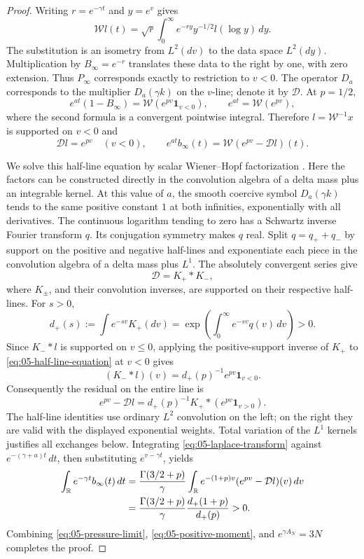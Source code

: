 \begin{proof}
Writing \(r=e^{-\gamma t}\) and \(y=e^v\) gives
\[
 \mathcal Wl(t)=\sqrt r\int_0^\infty e^{-ry}
                   y^{-1/2}l(\log y)\,dy.
\]
The substitution is an isometry from \(L^2(dv)\) to the data space \(L^2(dy)\). Multiplication by \(B_\infty=e^{-r}\) translates these data to the right by one, with zero extension. Thus \(P_\infty\) corresponds exactly to restriction to \(v<0\). The operator \(D_a\) corresponds to the multiplier \(D_a(\gamma k)\) on the \(v\)-line; denote it by \(\mathcal D\). At \(p=1/2\),
\[
 e^{at}(1-B_\infty)=\mathcal W(e^{pv}\mathbf1_{v<0}),
 \qquad e^{at}=\mathcal W(e^{pv}),
\]
where the second formula is a convergent pointwise integral. Therefore \(l=\mathcal W^{-1}x\) is supported on \(v<0\) and
\begin{equation}
 \mathcal Dl=e^{pv}\quad(v<0),\qquad
 e^{at}b_\infty(t)=\mathcal W(e^{pv}-\mathcal Dl)(t).
 \label{eq:05-half-line-equation}
\end{equation}

We solve this half-line equation by scalar Wiener--Hopf factorization
\cite{WienerHopf1931}. Here the factors can be constructed directly in
the convolution algebra of a delta mass plus an integrable kernel.
At this value of \(a\), the smooth coercive symbol \(D_a(\gamma k)\)
tends to the same positive constant \(1\) at both infinities,
exponentially with all derivatives. The continuous logarithm tending to zero has a Schwartz inverse Fourier transform \(q\). Its conjugation symmetry makes \(q\) real. Split \(q=q_++q_-\) by support on the positive and negative half-lines and exponentiate each piece in the convolution algebra of a delta mass plus \(L^1\). The absolutely convergent series give
\[
 \mathcal D=K_+*K_-,
\]
where \(K_\pm\), and their convolution inverses, are supported on their respective half-lines. For \(s>0\),
\[
 d_+(s):=\int e^{-sv}K_+(dv)
        =\exp\!\left(\int_0^\infty e^{-sv}q(v)\,dv\right)>0.
\]
Since \(K_-*l\) is supported on \(v\le0\), applying the positive-support inverse of \(K_+\) to \eqref{eq:05-half-line-equation} at \(v<0\) gives
\[
 (K_-*l)(v)=d_+(p)^{-1}e^{pv}\mathbf1_{v<0}.
\]
Consequently the residual on the entire line is
\begin{equation}
 e^{pv}-\mathcal Dl
   =d_+(p)^{-1}K_+*(e^{pv}\mathbf1_{v>0}).
 \label{eq:05-positive-residual}
\end{equation}
The half-line identities use ordinary \(L^2\) convolution on the left; on the right they are valid with the displayed exponential weights. Total variation of the \(L^1\) kernels justifies all exchanges below. Integrating \eqref{eq:05-laplace-transform} against \(e^{-(\gamma+a)t}\,dt\), then substituting \(e^{v-\gamma t}\), yields
\begin{align}
 \int_{\mathbb R}e^{-\gamma t}b_\infty(t)\,dt
 &=\frac{\Gamma(3/2+p)}{\gamma}
       \int_{\mathbb R}e^{-(1+p)v}(e^{pv}-\mathcal Dl)(v)\,dv\notag\\
 &=\frac{\Gamma(3/2+p)}{\gamma}
       \frac{d_+(1+p)}{d_+(p)}>0.
 \label{eq:05-positive-moment}
\end{align}
Combining \eqref{eq:05-pressure-limit}, \eqref{eq:05-positive-moment}, and \(e^{\gamma A_N}=3N\) completes the proof.
\end{proof}

